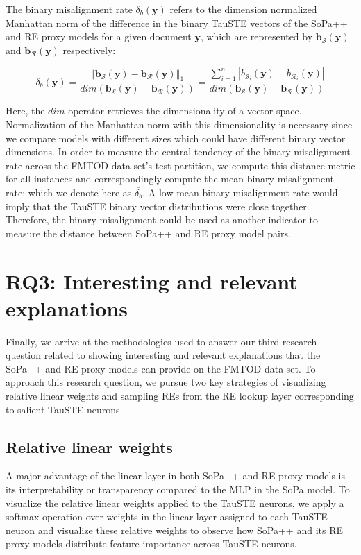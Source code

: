 The binary misalignment rate $\delta_b(\bm{y})$ refers to the dimension
normalized Manhattan norm of the difference in the binary TauSTE vectors of the
SoPa++ and RE proxy models for a given document $\bm{y}$, which are represented
by $\bm{b_{\mathcal{S}}}(\bm{y})$ and $\bm{b_{\mathcal{R}}}(\bm{y})$
respectively:

\begin{equation}
  \delta_b(\bm{y}) = \dfrac{\left\Vert \bm{b_{\mathcal{S}}}(\bm{y}) - \bm{b_{\mathcal{R}}}(\bm{y}) \right\Vert_{1}}{dim(\bm{b_{\mathcal{S}}}(\bm{y}) - \bm{b_{\mathcal{R}}}(\bm{y}))} = \dfrac{\sum^n_{i=1} |b_{\mathcal{S}_i}(\bm{y}) - b_{\mathcal{R}_i}(\bm{y})|}{{dim(\bm{b_{\mathcal{S}}}(\bm{y}) - \bm{b_{\mathcal{R}}}(\bm{y}))}}
\end{equation}

Here, the $dim$ operator retrieves the dimensionality of a vector space.
Normalization of the Manhattan norm with this dimensionality is necessary since
we compare models with different sizes which could have different binary vector
dimensions. In order to measure the central tendency of the binary misalignment
rate across the FMTOD data set's test partition, we compute this distance metric
for all instances and correspondingly compute the mean binary misalignment rate;
which we denote here as $\overline{\delta_b}$. A low mean binary misalignment
rate would imply that the TauSTE binary vector distributions were close
together. Therefore, the binary misalignment could be used as another indicator
to measure the distance between SoPa++ and RE proxy model pairs.

\section{RQ3: Interesting and relevant explanations}

Finally, we arrive at the methodologies used to answer our third research
question related to showing interesting and relevant explanations that the
SoPa++ and RE proxy models can provide on the FMTOD data set. To approach this
research question, we pursue two key strategies of visualizing relative linear
weights and sampling REs from the RE lookup layer corresponding to salient
TauSTE neurons.

\subsection{Relative linear weights}

A major advantage of the linear layer in both SoPa++ and RE proxy models is its
interpretability or transparency compared to the MLP in the SoPa model. To
visualize the relative linear weights applied to the TauSTE neurons, we apply a
softmax operation over weights in the linear layer assigned to each TauSTE
neuron and visualize these relative weights to observe how SoPa++ and its RE
proxy models distribute feature importance across TauSTE neurons.

